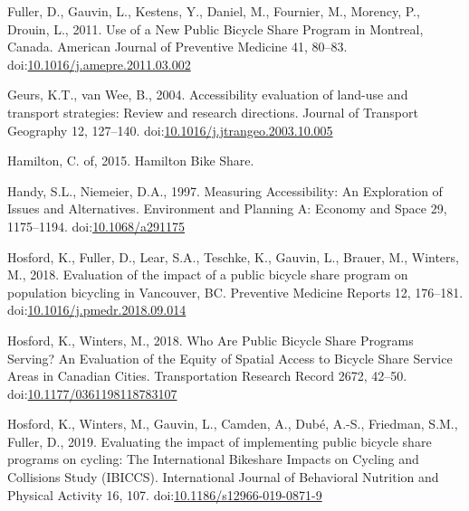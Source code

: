 \documentclass[]{elsarticle} %
\begin{document}
\leavevmode\hypertarget{ref-fullerUseNewPublic2011}{}%
Fuller, D., Gauvin, L., Kestens, Y., Daniel, M., Fournier, M., Morency,
P., Drouin, L., 2011. Use of a New Public Bicycle Share Program in
Montreal, Canada. American Journal of Preventive Medicine 41, 80--83.
doi:\href{https://doi.org/10.1016/j.amepre.2011.03.002}{10.1016/j.amepre.2011.03.002}

\leavevmode\hypertarget{ref-geursAccessibilityEvaluationLanduse2004}{}%
Geurs, K.T., van Wee, B., 2004. Accessibility evaluation of land-use and
transport strategies: Review and research directions. Journal of
Transport Geography 12, 127--140.
doi:\href{https://doi.org/10.1016/j.jtrangeo.2003.10.005}{10.1016/j.jtrangeo.2003.10.005}

\leavevmode\hypertarget{ref-hamiltonHamiltonBikeShare2015}{}%
Hamilton, C. of, 2015. Hamilton Bike Share.

\leavevmode\hypertarget{ref-handyMeasuringAccessibilityExploration1997}{}%
Handy, S.L., Niemeier, D.A., 1997. Measuring Accessibility: An
Exploration of Issues and Alternatives. Environment and Planning A:
Economy and Space 29, 1175--1194.
doi:\href{https://doi.org/10.1068/a291175}{10.1068/a291175}

\leavevmode\hypertarget{ref-hosfordEvaluationImpactPublic2018}{}%
Hosford, K., Fuller, D., Lear, S.A., Teschke, K., Gauvin, L., Brauer,
M., Winters, M., 2018. Evaluation of the impact of a public bicycle
share program on population bicycling in Vancouver, BC. Preventive
Medicine Reports 12, 176--181.
doi:\href{https://doi.org/10.1016/j.pmedr.2018.09.014}{10.1016/j.pmedr.2018.09.014}

\leavevmode\hypertarget{ref-hosfordWhoArePublic2018}{}%
Hosford, K., Winters, M., 2018. Who Are Public Bicycle Share Programs
Serving? An Evaluation of the Equity of Spatial Access to Bicycle Share
Service Areas in Canadian Cities. Transportation Research Record 2672,
42--50.
doi:\href{https://doi.org/10.1177/0361198118783107}{10.1177/0361198118783107}

\leavevmode\hypertarget{ref-hosfordEvaluatingImpactImplementing2019}{}%
Hosford, K., Winters, M., Gauvin, L., Camden, A., Dubé, A.-S., Friedman,
S.M., Fuller, D., 2019. Evaluating the impact of implementing public
bicycle share programs on cycling: The International Bikeshare Impacts
on Cycling and Collisions Study (IBICCS). International Journal of
Behavioral Nutrition and Physical Activity 16, 107.
doi:\href{https://doi.org/10.1186/s12966-019-0871-9}{10.1186/s12966-019-0871-9}
\end{document}
